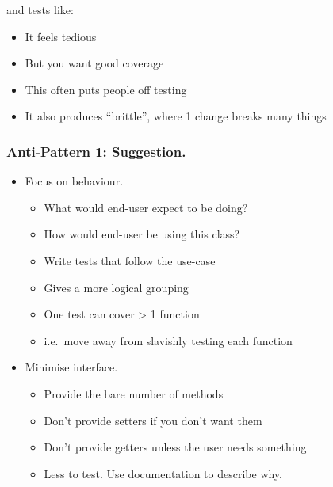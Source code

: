 and tests like:

\begin{Shaded}
\begin{Highlighting}[]
    \NormalTok{, } \NormalTok{) \{}


        \NormalTok{);}
        \NormalTok{);}
        \NormalTok{);}
        \NormalTok{);}
\end{Highlighting}
\end{Shaded}

\begin{itemize}
\itemsep1pt\parskip0pt
\item
  It feels tedious
\item
  But you want good coverage
\item
  This often puts people off testing
\item
  It also produces ``brittle'', where 1 change breaks many things
\end{itemize}

\subsubsection{Anti-Pattern 1:
Suggestion.}\label{anti-pattern-1-suggestion.}

\begin{itemize}
\itemsep1pt\parskip0pt
\item
  Focus on behaviour.

  \begin{itemize}
  \itemsep1pt\parskip0pt
  \item
    What would end-user expect to be doing?
  \item
    How would end-user be using this class?
  \item
    Write tests that follow the use-case
  \item
    Gives a more logical grouping
  \item
    One test can cover \textgreater{} 1 function
  \item
    i.e.~move away from slavishly testing each function
  \end{itemize}
\item
  Minimise interface.

  \begin{itemize}
  \itemsep1pt\parskip0pt
  \item
    Provide the bare number of methods
  \item
    Don't provide setters if you don't want them
  \item
    Don't provide getters unless the user needs something
  \item
    Less to test. Use documentation to describe why.
  \end{itemize}
\end{itemize}

